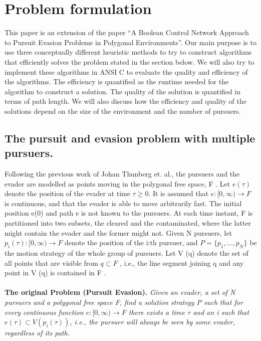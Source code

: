 \chapter{Problem formulation}

This paper is an extension of the paper ``A Boolean Control Network Approach to Pursuit Evasion Problems in Polygonal Environments''\cite{paper1}. Our main purpose is to use three conceptually different heuristic methods to try to construct algorithms that efficiently solves the problem stated in the section below. We will also try to implement these algorithms in ANSI C to evaluate the quality and efficiency of the algorithms. The efficiency is quantified as the runtime needed for the algorithm to construct a solution. The quality of the solution is quantified in terms of path length. We will also discuss how the efficiency and quality of the solutions depend on the size of the environment and the number of pursuers.
\section {The pursuit and evasion problem with multiple pursuers.}
Following the previous work of Johan Thunberg  et. al.\cite{paper1}, the pursuers and the evader are modelled as points moving in the polygonal free space, F . Let  $e(\tau )$ denote the position of the evader at time $\tau \geq 0$. It is assumed that $e : \lbrack 0, \infty) \to F$ is continuous, and that the evader is able to move arbitrarily fast. The initial position e(0) and path e is not known to the pursuers. At each time instant, F is partitioned into two subsets, the cleared and the contaminated, where the latter might contain the evader and the former might not. Given N pursuers, let $p_i (\tau ) : \lbrack 0, \infty) \to F$ denote the position of the i:th pursuer, and $P = \lbrace p_1 , . . . , p_N \rbrace$ be the motion strategy of the whole group of pursuers. Let V (q) denote the set of all points that are visible from $q \subset F$ , i.e., the line segment joining q and any point in V (q) is contained in F .\\
\\
\textbf{The original Problem (Pursuit Evasion).} \emph{ Given an evader, a set of N pursuers and a polygonal free space F, find a solution strategy P such that for every continuous function $e : \lbrack 0, \infty) \to F$ there exists a time $\tau$ and an i such that $e(\tau ) \subset V (p_i (\tau ))$, i.e., the pursuer will always be seen by some evader, regardless of its path. }

